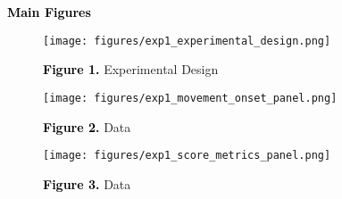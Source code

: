 \documentclass[12pt,letterpaper]{article}
\newcommand{\SethCaption}[2]{\noindent\textbf{\textcolor{black}{#1}} {#2}}
\newcommand{\SectionHeader}[1]{\noindent\textbf{\Large{\textcolor{black}{#1}}}\normalsize }
\begin{document}
\SectionHeader{Main Figures}

\begin{figure}[H]
    \centering
    \texttt{[image: figures/exp1\_experimental\_design.png]}
    
    \SethCaption{Figure 1.}{Experimental Design}
\end{figure}
\begin{figure}[H]
    \centering
    \texttt{[image: figures/exp1\_movement\_onset\_panel.png]}
    
    \SethCaption{Figure 2.}{Data}
\end{figure}
\begin{figure}[H]
    \centering
    \texttt{[image: figures/exp1\_score\_metrics\_panel.png]}
    
    \SethCaption{Figure 3.}{Data}
\end{figure}
\end{document}
